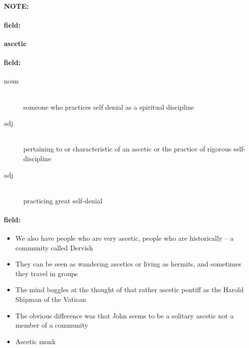 \documentclass[12pt]{article}
\newenvironment{note}{\paragraph{NOTE:}}{}
\newenvironment{field}{\paragraph{field:}}{}
\begin{document}
\begin{note}
\begin{field}
\textbf{\large ascetic}
\end{field}


\begin{field}
\begin{description}
\item[noun] \hfill \\ 
someone who practices self denial as a spiritual discipline

\item[adj] \hfill \\ 
pertaining to or characteristic of an ascetic or the practice of rigorous self-discipline

\item[adj] \hfill \\ 
practicing great self-denial

\end{description}
\end{field}

\begin{field}
\begin{itemize}
\item We also have people who are very ascetic, people who are historically -- a community called Dervish
\item They can be seen as wandering ascetics or living as hermits, and sometimes they travel in groups
\item The mind boggles at the thought of that rather ascetic pontiff as the Harold Shipman of the Vatican
\item The obvious difference was that John seems to be a solitary ascetic not a member of a community
\item Ascetic monk
\end{itemize}
\end{field}
\end{note}
\end{document}

